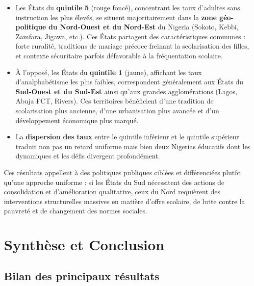 \documentclass[
  11pt,
]{article}
\begin{document}
\begin{itemize}
\item
  Les États du \textbf{quintile 5} (rouge foncé), concentrant les taux
  d'adultes sans instruction les plus élevés, se situent majoritairement
  dans la \textbf{zone géo-politique du Nord-Ouest et du Nord-Est} du
  Nigeria (Sokoto, Kebbi, Zamfara, Jigawa, etc.). Ces États partagent
  des caractéristiques communes : forte ruralité, traditions de mariage
  précoce freinant la scolarisation des filles, et contexte sécuritaire
  parfois défavorable à la fréquentation scolaire.
\item
  À l'opposé, les États du \textbf{quintile 1} (jaune), affichant les
  taux d'analphabétisme les plus faibles, correspondent généralement aux
  États du \textbf{Sud-Ouest et du Sud-Est} ainsi qu'aux grandes
  agglomérations (Lagos, Abuja FCT, Rivers). Ces territoires bénéficient
  d'une tradition de scolarisation plus ancienne, d'une urbanisation
  plus avancée et d'un développement économique plus marqué.
\item
  La \textbf{dispersion des taux} entre le quintile inférieur et le
  quintile supérieur traduit non pas un retard uniforme mais bien deux
  Nigerias éducatifs dont les dynamiques et les défis divergent
  profondément.
\end{itemize}

Ces résultats appellent à des politiques publiques ciblées et
différenciées plutôt qu'une approche uniforme : si les États du Sud
nécessitent des actions de consolidation et d'amélioration qualitative,
ceux du Nord requièrent des interventions structurelles massives en
matière d'offre scolaire, de lutte contre la pauvreté et de changement
des normes sociales.

\section{Synthèse et Conclusion}\label{synthuxe8se-et-conclusion}

\subsection{Bilan des principaux
résultats}\label{bilan-des-principaux-ruxe9sultats}

\begingroup\fontsize{9}{11}\selectfont
\end{document}
